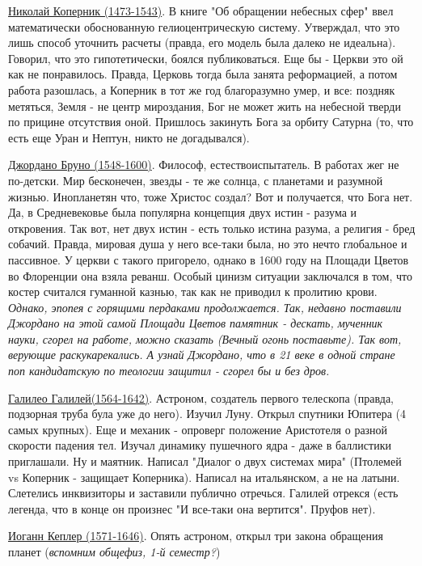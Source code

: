 \underline{Николай Коперник (1473-1543)}. В книге "Об обращении небесных сфер" ввел математически обоснованную гелиоцентрическую систему. Утверждал, что это лишь способ уточнить расчеты (правда, его модель была далеко не идеальна). Говорил, что это гипотетически, боялся публиковаться. Еще бы - Церкви это ой как не понравилось. Правда, Церковь тогда была занята реформацией, а потом работа разошлась, а Коперник в тот же год благоразумно умер, и все: поздняк метяться, Земля - не центр мироздания, Бог не может жить на небесной тверди по прицине отсутствия оной. Пришлось закинуть Бога за орбиту Сатурна (то, что есть еще Уран и Нептун, никто не догадывался).

\underline{Джордано Бруно (1548-1600)}. Философ, естествоиспытатель. В работах жег не по-детски. Мир бесконечен, звезды - те же солнца, с планетами и разумной жизнью. Инопланетян что, тоже Христос создал? Вот и получается, что Бога нет. Да, в Средневековье была популярна концепция двух истин - разума и откровения. Так вот, нет двух истин - есть только истина разума, а религия - бред собачий.  Правда, мировая душа у него все-таки была, но это нечто глобальное и пассивное. У церкви с такого пригорело, однако в 1600 году на Площади Цветов во Флоренции она взяла реванш. Особый цинизм ситуации заключался в том, что костер считался гуманной казнью, так как не приводил к пролитию крови. \textit{Однако, эпопея с горящими пердаками продолжается. Так, недавно поставили Джордано на этой самой Площади Цветов памятник - дескать, мученник науки, сгорел на работе, можно сказать (\textit{Вечный огонь поставьте}). Так вот, верующие раскукарекались. А узнай Джордано, что в 21 веке в одной стране поп кандидатскую по теологии защитил - сгорел бы и без дров.}

\underline{Галилео Галилей(1564-1642)}. Астроном, создатель первого телескопа (правда, подзорная труба була уже до него). Изучил Луну. Открыл спутники Юпитера (4 самых крупных). Еще и механик - опроверг положение Аристотеля о разной скорости падения тел. Изучал динамику пушечного ядра - даже в баллистики приглашали. Ну и маятник. Написал "Диалог о двух системах мира" (Птолемей vs Коперник - защищает Коперника). Написал на итальянском, а не на латыни. Слетелись инквизиторы и заставили публично отречься. Галилей отрекся (есть легенда, что в конце он произнес "И все-таки она вертится". Пруфов нет).  

\underline{Иоганн Кеплер (1571-1646)}. Опять астроном, открыл три закона обращения планет (\textit{вспомним общефиз, 1-й семестр?})

